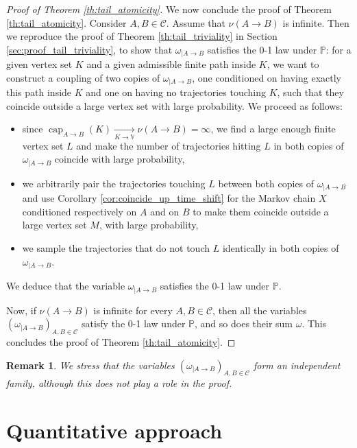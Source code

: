\documentclass[12pt,a4paper]{article}
\newtheorem{remark}[theo]{Remark}
\newcommand{\1}[1]{{\mathbf 1}{\{#1\}}}
\newcommand{\8}{{\infty}}
\newcommand{\capa}{\mathop{\mathrm{cap}}}
\begin{document}
\begin{proof}[Proof of Theorem \ref{th:tail_atomicity}]
We now conclude the proof of Theorem \ref{th:tail_atomicity}. 
Consider $A, B \in \mathcal{C}$. Assume that $\nu(A\to B)$ is infinite. Then we reproduce the proof of Theorem \ref{th:tail_triviality} in Section \ref{sec:proof_tail_triviality}, to show that $\omega_{|A\to B}$ satisfies the 0-1 law under $\mathbb{P}$: for a given vertex set $K$ and a given admissible finite path inside $K$, we want to construct a coupling of two copies of $\omega_{|A\to B}$, one conditioned on having exactly this path inside $K$ and one on having no trajectories touching $K$, such that they coincide outside a large vertex set with large probability. We proceed as follows:
\begin{itemize}
\item since $\capa_{A\to B}(K)\underset{K \to \mathbb{V} }\longrightarrow \nu(A\to B) = \infty$, we find a large enough finite vertex set $L$ and make the number of trajectories hitting $L$ in both copies of $\omega_{|A\to B}$ coincide with large probability,
\item we arbitrarily pair the trajectories touching $L$ between both copies of $\omega_{|A\to B}$ and use Corollary \ref{cor:coincide_up_time_shift} for the Markov chain $X$ conditioned respectively on $A$ and on $B$ to make them coincide outside a large vertex set $M$, with large probability,
\item we sample the trajectories that do not touch $L$ identically in both copies of $\omega_{|A\to B}$.
\end{itemize}
We deduce that the variable $\omega_{|A\to B} $ satisfies the 0-1 law under $\mathbb{P}$. 


Now, if $\nu(A\to B)$ is infinite for every $A, B \in \mathcal{C}$, then all the variables $(\omega_{|A\to B})_{A,B  \in \mathcal{C} }$ satisfy the 0-1 law under $\mathbb{P}$, and so does their sum $\omega$.
This concludes the proof of Theorem \ref{th:tail_atomicity}.
\end{proof}

\begin{remark}
We stress that the variables $(\omega_{|A\to B})_{A,B  \in \mathcal{C} }$ form an independent family, although this does not play a role in the proof. 
\end{remark}




\section{Quantitative approach}\label{sec:quantitative}
\end{document}
